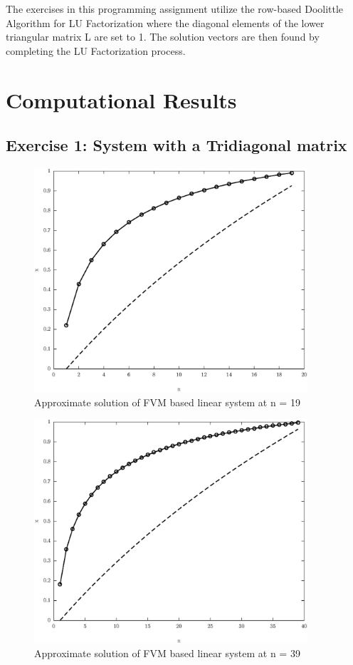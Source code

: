 \documentclass[11pt]{article}
\begin{document}
The exercises in this programming assignment utilize the row-based Doolittle Algorithm for LU Factorization where the diagonal elements of the lower triangular matrix L are set to 1. The solution vectors are then found by completing the LU Factorization process. 



\newpage

\section{Computational Results}

\subsection{Exercise 1: System with a Tridiagonal matrix}

\begin{figure}[!hbt]
\begin{center}
	\includegraphics[width=4in]{math609_pa1_comp_example_1_n_19.eps}
	\caption{Approximate solution of FVM based linear system at n = 19}
\end{center}
\end{figure}

\begin{figure}[!hbt]
\begin{center}
	\includegraphics[width=4in]{math609_pa1_comp_example_1_n_39.eps}
	\caption{Approximate solution of FVM based linear system at n = 39}
\end{center}
\end{figure}
\end{document}
